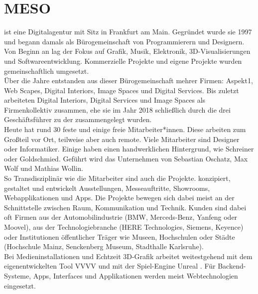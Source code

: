 \section{MESO}
\label{sec:meso}

\mesoFull{} ist eine Digitalagentur mit Sitz in Frankfurt am Main.
Gegründet wurde sie 1997 und begann damals als Bürogemeinschaft von Programmierern
und Designern. Von Beginn an lag der Fokus auf Grafik, Musik, Elektronik, 3D-Visualisierungen
und Softwareentwicklung. Kommerzielle Projekte und eigene Projekte wurden gemeinschaftlich
umgesetzt.\\

Über die Jahre entstanden aus dieser Bürogemeinschaft mehrer Firmen: Aspekt1, \meso{} Web Scapes, \meso{}
Digital Interiors, \meso{} Image Spaces und \meso{} Digital Services. Bis zuletzt arbeiteten 
\meso{} Digital Interiors, \meso{} Digital Services und \meso{} Image Spaces als Firmenkollektiv zusammen, 
ehe sie im Jahr 2018 schließlich durch die drei Geschäftsführer zu der \mesoFull{} zusammengelegt
wurden.\\

Heute hat \meso{} rund 30 feste und einige freie Mitarbeiter*innen. Diese arbeiten zum Großteil vor Ort, teilweise
aber auch remote. Viele Mitarbeiter sind Designer oder Informatiker. Einige haben einen handwerklichen
Hintergrund, wie Schreiner oder Goldschmied. Geführt wird das Unternehmen von Sebastian Oschatz, Max Wolf
und Mathias Wollin.\\
So Transdisziplinär wie die Mitarbeiter sind auch die Projekte. \meso{} konzipiert, gestaltet und entwickelt
Ausstellungen, Messeauftritte, Showrooms, Webapplikationen und Apps. Die Projekte bewegen sich dabei meist an der
Schnittstelle zwischen Raum, Kommunikation und Technik. Kunden sind dabei oft Firmen aus der
Automobilindustrie (BMW, Merceds-Benz, Yanfeng oder Moovel), aus der Technologiebranche (HERE Technologies,
Siemens, Keyence) oder Institutionen öffentlicher Träger wie Museen, Hochschulen oder Städte (Hochschule Mainz,
Senckenberg Museum, Stadthalle Karlsruhe).\\

Bei Medieninstallationen und Echtzeit 3D-Grafik arbeitet \meso{} weitestgehend mit dem eigenentwickelten 
Tool VVVV \cite{vvvv} und mit der Spiel-Engine Unreal \cite{unreal}. Für Backend-Systeme, Apps, Interfaces
und Applikationen werden meist Webtechnologien eingesetzt.

